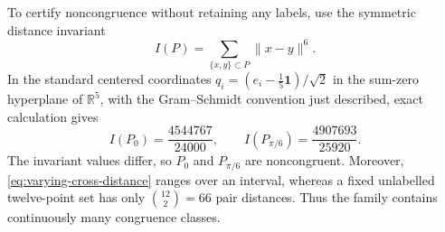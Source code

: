 \documentclass[11pt]{article}
\begin{document}
To certify noncongruence without retaining any labels, use the symmetric
distance invariant
\[
 I(P)=\sum_{\{x,y\}\subset P}\lVert x-y\rVert^6.
\]
In the standard centered coordinates
$q_i=(e_i-\frac15\mathbf1)/\sqrt2$ in the sum-zero hyperplane of
$\mathbb R^5$, with the Gram--Schmidt convention just described, exact
calculation gives
\[
 I(P_0)=\frac{4544767}{24000},
 \qquad
 I(P_{\pi/6})=\frac{4907693}{25920}.
\]
The invariant values differ, so $P_0$ and $P_{\pi/6}$ are noncongruent.
Moreover, \eqref{eq:varying-cross-distance} ranges over an interval, whereas
a fixed unlabelled twelve-point set has only $\binom{12}{2}=66$ pair
distances.  Thus the family contains continuously many congruence classes.
\end{document}
